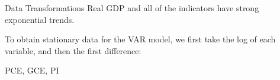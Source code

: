 \begin{frame}{Data Transformations}
    Real GDP and all of the indicators have strong exponential trends.
    
    To obtain stationary data for the VAR model, we first take the log
    of each variable, and then the first difference:
    
\end{frame}

\begin{frame}{1}
    PCE, GCE, PI
\end{frame}